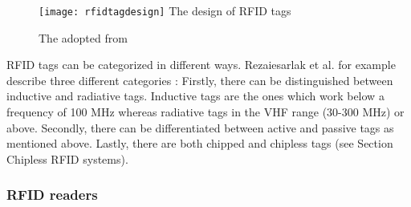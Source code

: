 \begin{figure}
\centering
\texttt{[image: rfidtagdesign]} The design of RFID tags 
\caption{\label{fig:tagdesign}The adopted from \cite[p.13]{chipless}} 
\end{figure}

RFID tags can be categorized in different ways. Rezaiesarlak et al. \cite{chipless} for example describe three different categories \cite[p.9 ff.]{chipless}: Firstly, there can be distinguished between inductive and radiative tags. Inductive tags are the ones which work below a frequency of 100 MHz whereas radiative tags in the \ac{VHF} range (30-300 MHz) or above. Secondly, there can be differentiated between active and passive tags as mentioned above. Lastly, there are both chipped and chipless tags (see Section Chipless RFID systems\pageref{chipless}). 

\subsubsection{RFID readers} \label{reader}

